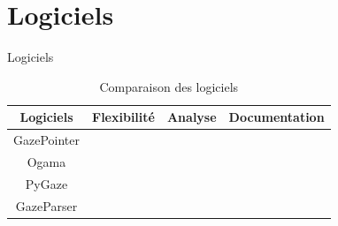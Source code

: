 \documentclass{beamer}
\newcommand{\cmark}{\ding{51}}
\newcommand{\xmark}{\ding{55}}
\begin{document}
\section{Logiciels}
\begin{frame}{Logiciels}
  \begin{table}[htpb]
    \begin{center}
      \begin{tabular}{|c||c|c|c|}
        \hline
        Logiciels      & Flexibilité   & Analyse       & Documentation \\
        \hline
        GazePointer    & \xmark        & \cmark        & \cmark        \\
        Ogama          & \xmark        & \cmark \cmark & \cmark        \\
        \alert{PyGaze} & \cmark \cmark & \cmark \cmark & \cmark \cmark \\
        GazeParser     & \cmark        & \cmark \cmark & \cmark        \\
        \hline
      \end{tabular}
      \caption{Comparaison des logiciels}
    \end{center}
  \end{table}
\end{frame}
\end{document}
